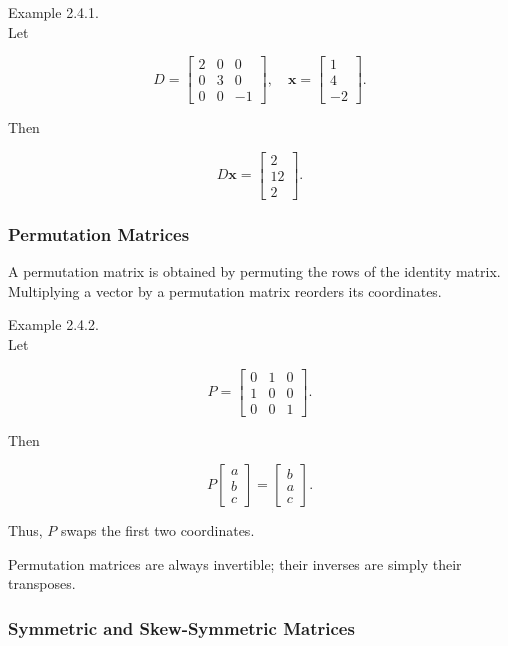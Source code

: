 \documentclass[
  12pt,
  a4paper,
]{article}
\begin{document}
Example 2.4.1.\\
Let

\[D = \begin{bmatrix} 2 & 0 & 0 \\ 0 & 3 & 0 \\ 0 & 0 & -1 \end{bmatrix}, \quad 
\mathbf{x} = \begin{bmatrix} 1 \\ 4 \\ -2 \end{bmatrix}.\]

Then

\[D\mathbf{x} = \begin{bmatrix} 2 \\ 12 \\ 2 \end{bmatrix}.\]

\subsubsection{Permutation Matrices}\label{permutation-matrices}

A permutation matrix is obtained by permuting the rows of the identity
matrix. Multiplying a vector by a permutation matrix reorders its
coordinates.

Example 2.4.2.\\
Let

\[P = \begin{bmatrix}
0 & 1 & 0 \\
1 & 0 & 0 \\
0 & 0 & 1
\end{bmatrix}.\]

Then

\[P\begin{bmatrix} a \\ b \\ c \end{bmatrix} =
\begin{bmatrix} b \\ a \\ c \end{bmatrix}.\]

Thus, \(P\) swaps the first two coordinates.

Permutation matrices are always invertible; their inverses are simply
their transposes.

\subsubsection{Symmetric and Skew-Symmetric
Matrices}\label{symmetric-and-skew-symmetric-matrices}
\end{document}
